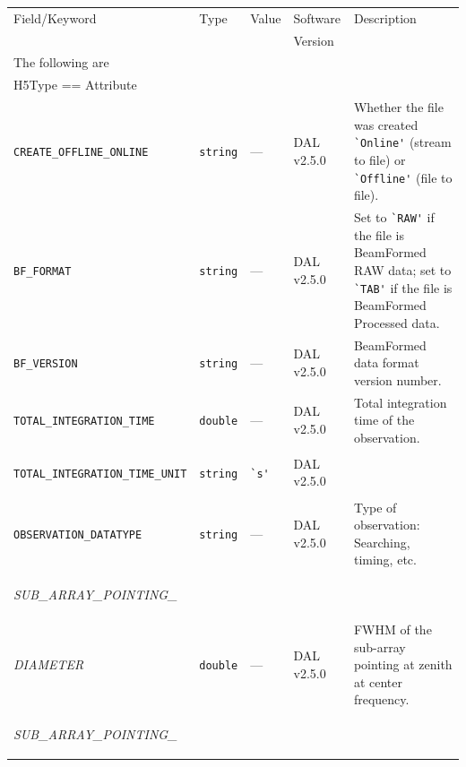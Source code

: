 \documentclass[a4paper,10pt,bibtotoc]{scrartcl}
\begin{document}


\begin{small}
\begin{table}[p]
\begin{small}
  \centering
  \begin{tabular}{|llllp{6cm}|}
    \hline
    \sc Field/Keyword  & \sc Type & \sc Value & \sc Software  & Description \\
    \sc   & \sc & \sc & \sc Version  & \\
    \hline \hline
    \sc The following are & \sc & \sc & \sc   &\\
    \sc H5Type == Attribute & \sc & \sc & \sc   &\\
    \hline 
  \begin{small}\verb|CREATE_OFFLINE_ONLINE|\end{small}  & \verb|string| & --- & DAL v2.5.0  & Whether the file was created \verb|`Online'| (stream to file) or \verb|`Offline'| (file to file). \\
 \verb|BF_FORMAT|  & \verb|string| & --- & DAL v2.5.0 &  Set to \verb|`RAW'| if the file is BeamFormed RAW data; set to \verb|`TAB'| if the file is BeamFormed Processed data.  \\
 \verb|BF_VERSION|  & \verb|string| & --- & DAL v2.5.0 &  BeamFormed data format version number.\\  
  \begin{small}\verb|TOTAL_INTEGRATION_TIME|\end{small} & \verb|double| & --- & DAL v2.5.0 & Total integration time
  of the observation. \\
  \begin{small}\verb|TOTAL_INTEGRATION_TIME_UNIT|\end{small} & \verb|string| & \verb|`s'| & DAL v2.5.0 & \\
  \verb|OBSERVATION_DATATYPE|  & \verb|string| & --- & DAL v2.5.0 &  Type of observation: Searching, timing, etc. \\
  \begin{scriptsize}\textit{SUB\_ARRAY\_POINTING\_}\end{scriptsize} &  &  & & \\
  \begin{scriptsize}\textit{ DIAMETER}\end{scriptsize} & \verb|double| & --- & DAL v2.5.0 & FWHM of the sub-array pointing at zenith at center frequency. \\
  \begin{scriptsize}\textit{SUB\_ARRAY\_POINTING\_}\end{scriptsize}  &  &  & & \\

\end{tabular}
\end{small}
\end{table}
\end{small}
\end{document}
